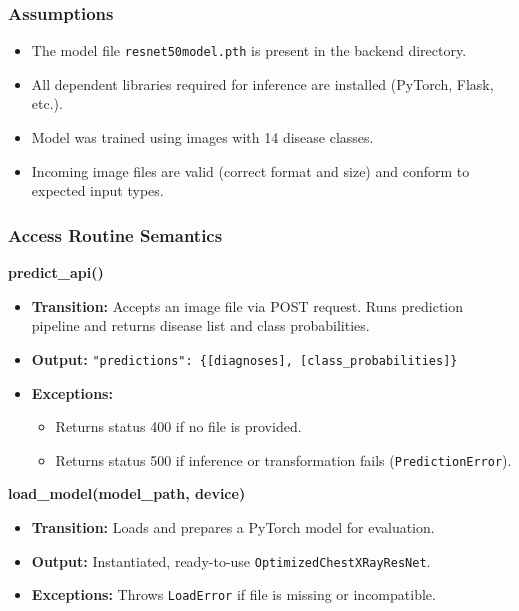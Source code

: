 \documentclass[12pt, titlepage]{article}
\begin{document}
\subsubsection{Assumptions}
\label{sec:MLBackendAssumptions}

\begin{itemize}
    \item The model file \texttt{resnet50model.pth} is present in the backend directory.
    \item All dependent libraries required for inference are installed (PyTorch, Flask, etc.).
    \item Model was trained using images with 14 disease classes.
    \item Incoming image files are valid (correct format and size) and conform to expected input types.
\end{itemize}

\subsubsection{Access Routine Semantics}
\label{sec:MLBackendAccessRoutineSemantics}

\textbf{predict\_api()}

\begin{itemize}
    \item \textbf{Transition:} Accepts an image file via POST request. Runs prediction pipeline and returns disease list and class probabilities.
    \item \textbf{Output:} \texttt{"predictions": \{[diagnoses], [class\_probabilities]\}}
    \item \textbf{Exceptions:} 
    \begin{itemize}
        \item Returns status 400 if no file is provided.
        \item Returns status 500 if inference or transformation fails (\texttt{PredictionError}).
    \end{itemize}
\end{itemize}

\textbf{load\_model(model\_path, device)}

\begin{itemize}
    \item \textbf{Transition:} Loads and prepares a PyTorch model for evaluation.
    \item \textbf{Output:} Instantiated, ready-to-use \texttt{OptimizedChestXRayResNet}.
    \item \textbf{Exceptions:} Throws \texttt{LoadError} if file is missing or incompatible.
\end{itemize}
\end{document}
